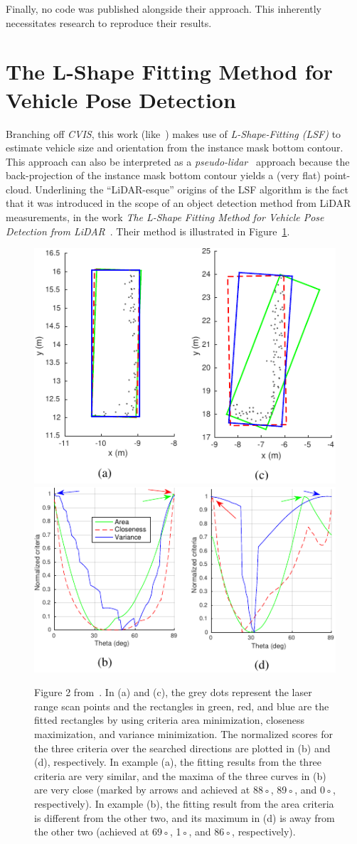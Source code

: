 Finally, no code was published alongside their approach.
This inherently necessitates research to reproduce their results.

\section{The L-Shape Fitting Method for Vehicle Pose Detection}
\label{sec:related-lshape-fitting}

Branching off \textit{CVIS}, this work (like~\cite{leonthesis}) makes use of \textit{L-Shape-Fitting (LSF)} to estimate vehicle size and orientation from the instance mask bottom contour.
This approach can also be interpreted as a \textit{pseudo-lidar}~\cite{survey2022} approach because the back-projection of the instance mask bottom contour yields a (very flat) point-cloud.
Underlining the \enquote{LiDAR-esque} origins of the LSF algorithm is the fact that it was introduced in the scope of an object detection method from LiDAR measurements, in the work \textit{The L-Shape Fitting Method for Vehicle Pose Detection from LiDAR}~\cite{zhang2017efficient}.
Their method is illustrated in Figure~\ref{fig:related-lsf}.

\begin{figure}[htb]
    \centering
    \includegraphics[width=0.49\linewidth]{figures/l_shape_fitting_fig_2_1-cropped}
    \includegraphics[width=0.49\linewidth]{figures/l_shape_fitting_fig_2_2-cropped}
    \caption{Figure 2 from~\cite{zhang2017efficient}. In (a) and (c), the grey dots represent the laser range scan points and the rectangles in green, red, and blue are the fitted rectangles by using criteria area minimization, closeness maximization, and variance minimization. The normalized scores for the three criteria over the searched directions are plotted in (b) and (d), respectively. In example (a), the fitting results from the three criteria are very similar, and the maxima of the three curves in (b) are very close (marked by arrows and achieved at 88◦, 89◦, and 0◦, respectively). In example (b), the fitting result from the area criteria is different from the other two, and its maximum in (d) is away from the other two (achieved at 69◦, 1◦, and 86◦, respectively).}
    \label{fig:related-lsf}
\end{figure}

